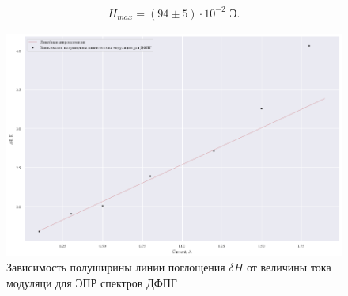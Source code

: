 \documentclass[a4paper,14pt]{article}
\begin{document}
\begin{gather*}
	H_{max} = (94 \pm 5) \cdot 10^{-2} \text{ Э}.
\end{gather*} 
\begin{figure}[h]
	\centering
	\includegraphics{рис9}
	\caption{Зависимость полуширины линии поглощения $ \delta H $ от величины тока модуляци для ЭПР спектров ДФПГ}
	\label{fig:9}
\end{figure}
\end{document}
